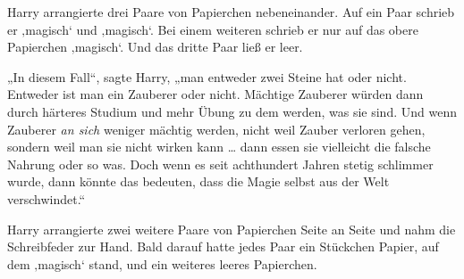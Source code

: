 Harry arrangierte drei Paare von Papierchen nebeneinander. Auf ein Paar schrieb er ‚magisch‘ und ‚magisch‘. Bei einem weiteren schrieb er nur auf das obere Papierchen ‚magisch‘. Und das dritte Paar ließ er leer.

„In diesem Fall“, sagte Harry, „man entweder zwei Steine hat oder nicht. Entweder ist man ein Zauberer oder nicht. Mächtige Zauberer würden dann durch härteres Studium und mehr Übung zu dem werden, was sie sind. Und wenn Zauberer \emph{an sich} weniger mächtig werden, nicht weil Zauber verloren gehen, sondern weil man sie nicht wirken kann … dann essen sie vielleicht die falsche Nahrung oder so was. Doch wenn es seit achthundert Jahren stetig schlimmer wurde, dann könnte das bedeuten, dass die Magie selbst aus der Welt verschwindet.“

Harry arrangierte zwei weitere Paare von Papierchen Seite an Seite und nahm die Schreibfeder zur Hand. Bald darauf hatte jedes Paar ein Stückchen Papier, auf dem ‚magisch‘ stand, und ein weiteres leeres Papierchen.

